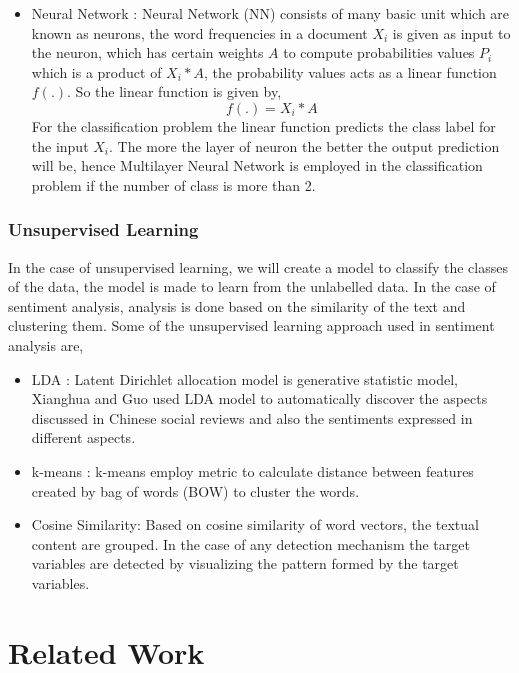 \documentclass[sigconf]{acmart}
\begin{document}
\begin{itemize}
    \item Neural Network : Neural Network (NN) consists of many basic unit which are known as neurons, the word frequencies in a document $X_i$ is given as input to the neuron, which has certain weights $A$ to compute probabilities values $P_i$ which is a product of $X_i*A$, the probability values acts as a linear function $f(.)$. So the linear function is given by,
    \begin{equation*}
    f(.) = X_i*A    
    \end{equation*}
    For the classification problem the linear function predicts the class label for the input $X_i$. The more the layer of neuron the better the output prediction will be, hence Multilayer Neural Network is employed in the classification problem if the number of class is more than 2.
\end{itemize}

\subsubsection*{Unsupervised Learning}
In the case of unsupervised learning, we will create a model to classify the classes of the data, the model is made to learn from the unlabelled data. In the case of sentiment analysis, analysis is done based on the similarity of the text and clustering them. Some of the unsupervised learning approach used in sentiment analysis are, 
\begin{itemize}
    \item LDA :  Latent Dirichlet allocation model is generative statistic model, Xianghua and Guo \cite{XIANGHUA2013186} used LDA model to automatically discover the aspects discussed in Chinese social reviews and also the sentiments expressed in different aspects.
    \item k-means : k-means employ metric to calculate distance between features created by bag of words (BOW) to cluster the words. 
    \item Cosine Similarity: Based on cosine similarity of word vectors, the textual content are grouped. In the case of any detection mechanism the target variables are detected by visualizing the pattern formed by the target variables.

\end{itemize}

\section{Related Work}
\end{document}

